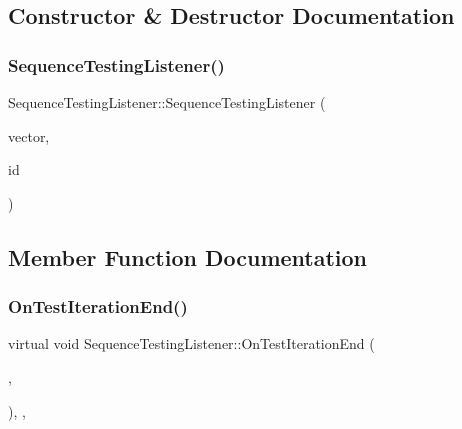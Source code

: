 \subsection{Constructor \& Destructor Documentation}
\mbox{\label{classSequenceTestingListener_ac0fcb350d20876f8273621ad4c79ba7a}} 
\subsubsection{\texorpdfstring{SequenceTestingListener()}{SequenceTestingListener()}}
{\footnotesize\ttfamily Sequence\+Testing\+Listener\+::\+Sequence\+Testing\+Listener (\begin{DoxyParamCaption}\item[{std\+::vector$<$ std\+::string $>$ $\ast$}]{vector,  }\item[{const char $\ast$}]{id }\end{DoxyParamCaption})\hspace{0.3cm}{\ttfamily [inline]}}



\subsection{Member Function Documentation}
\mbox{\label{classSequenceTestingListener_a783bc01e2a95f5bf73bbde4d96832e0f}} 
\subsubsection{\texorpdfstring{OnTestIterationEnd()}{OnTestIterationEnd()}}
{\footnotesize\ttfamily virtual void Sequence\+Testing\+Listener\+::\+On\+Test\+Iteration\+End (\begin{DoxyParamCaption}\item[{const \mbox{\hyperlink{classtesting_1_1UnitTest}{Unit\+Test}} \&}]{,  }\item[{int}]{ }\end{DoxyParamCaption})\hspace{0.3cm}{\ttfamily [inline]}, {\ttfamily [protected]}, {\ttfamily [virtual]}}



